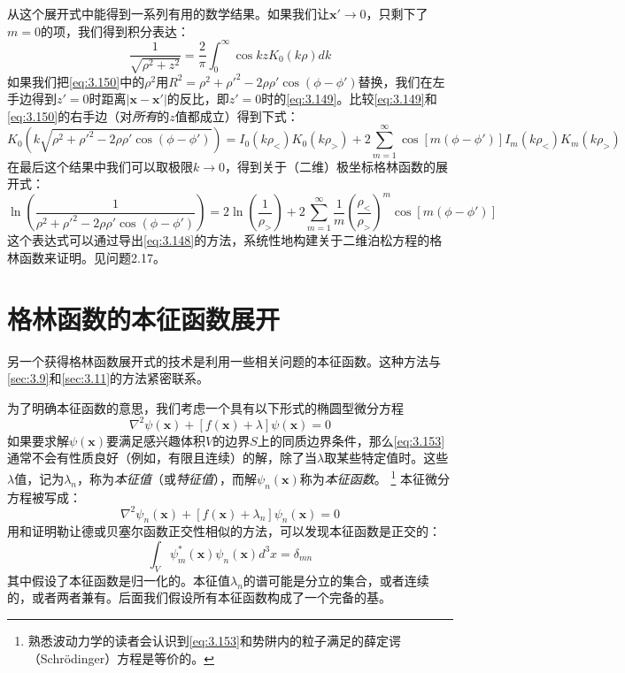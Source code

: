 \documentclass[12pt]{book}
\numberwithin{equation}{chapter}
\numberwithin{figure}{chapter}
\numberwithin{footnote}{page}
\begin{document}
从这个展开式中能得到一系列有用的数学结果。如果我们让$\mathbf{x'}\to0$，只剩下了$m=0$的项，我们得到积分表达：
\begin{equation}\label{eq:3.150}
    \frac{1}{\sqrt{\rho^2+z^2}}=\frac{2}{\pi}\int_0^\infty \cos kz K_0(k\rho) dk
\end{equation}
如果我们把\autoref{eq:3.150}中的$\rho^2$用$R^2=\rho^2+\rho'^2-2\rho\rho'\cos(\phi-\phi')$替换，我们在左手边得到$z'=0$时距离$|\mathbf{x}-\mathbf{x'}|$的反比，即$z'=0$时的\autoref{eq:3.149}。比较\autoref{eq:3.149}和\autoref{eq:3.150}的右手边（对\textit{所有}的$z$值都成立）得到下式：
\begin{equation}\label{eq:3.151}
    K_0(k\sqrt{\rho^2+\rho'^2-2\rho\rho'\cos(\phi-\phi')})=I_0(k\rho_<)K_0(k\rho_>)+2\sum_{m=1}^{\infty}\cos[m(\phi-\phi')]I_m(k\rho_<)K_m(k\rho_>)
\end{equation}
在最后这个结果中我们可以取极限$k\to0$，得到关于（二维）极坐标格林函数的展开式：
\begin{equation}\label{eq:3.152}
    \ln(\frac{1}{\rho^2+\rho'^2-2\rho\rho'\cos(\phi-\phi')})=2\ln(\frac{1}{\rho_>})+2\sum_{m=1}^\infty \frac{1}{m}(\frac{\rho_<}{\rho_>})^m\cos[m(\phi-\phi')]
\end{equation}
这个表达式可以通过导出\autoref{eq:3.148}的方法，系统性地构建关于二维泊松方程的格林函数来证明。见问题2.17。

\section{格林函数的本征函数展开}\label{sec:3.12}

另一个获得格林函数展开式的技术是利用一些相关问题的本征函数。这种方法与\autoref{sec:3.9}和\autoref{sec:3.11}的方法紧密联系。

为了明确本征函数的意思，我们考虑一个具有以下形式的椭圆型微分方程
\begin{equation}\label{eq:3.153}
    \nabla^2 \psi(\mathbf{x})+[f(\mathbf{x})+\lambda]\psi(\mathbf{x})=0
\end{equation}
如果要求解$\psi(\mathbf{x})$要满足感兴趣体积$V$的边界$S$上的同质边界条件，那么\autoref{eq:3.153}通常不会有性质良好（例如，有限且连续）的解，除了当$\lambda$取某些特定值时。这些$\lambda$值，记为$\lambda_n$，称为\textit{本征值}（或\textit{特征值}），而解$\psi_n(\mathbf{x})$称为\textit{本征函数}。
\footnote{熟悉波动力学的读者会认识到\autoref{eq:3.153}和势阱内的粒子满足的薛定谔（Schrödinger）方程是等价的。}
本征微分方程被写成：
\begin{equation}\label{eq:3.154}
    \nabla^2 \psi_n(\mathbf{x})+[f(\mathbf{x})+\lambda_n]\psi_n(\mathbf{x})=0
\end{equation}
用和证明勒让德或贝塞尔函数正交性相似的方法，可以发现本征函数是正交的：
\begin{equation}\label{eq:3.155}
    \int_V \psi_m^*(\mathbf{x})\psi_n(\mathbf{x}) d^3x=\delta_{mn}
\end{equation}
其中假设了本征函数是归一化的。本征值$\lambda_n$的谱可能是分立的集合，或者连续的，或者两者兼有。后面我们假设所有本征函数构成了一个完备的基。
\end{document}

